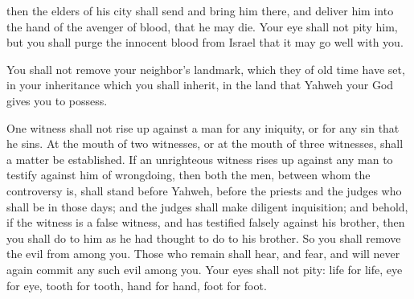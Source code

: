 {then the elders of his city shall send and bring him there, and deliver him into the hand of the avenger of blood, that he may die.
Your eye shall not pity him, but you shall purge the innocent blood from Israel that it may go well with you.
\par }{\PP {}You shall not remove your neighbor’s landmark, which they of old time have set, in your inheritance which you shall inherit, in the land that Yahweh your God gives you to possess.
\par }{\PP {}One witness shall not rise up against a man for any iniquity, or for any sin that he sins. At the mouth of two witnesses, or at the mouth of three witnesses, shall a matter be established.
If an unrighteous witness rises up against any man to testify against him of wrongdoing,
then both the men, between whom the controversy is, shall stand before Yahweh, before the priests and the judges who shall be in those days;
and the judges shall make diligent inquisition; and behold, if the witness is a false witness, and has testified falsely against his brother,
then you shall do to him as he had thought to do to his brother. So you shall remove the evil from among you.
Those who remain shall hear, and fear, and will never again commit any such evil among you.
Your eyes shall not pity: life for life, eye for eye, tooth for tooth, hand for hand, foot for foot.

}
